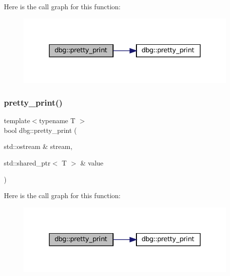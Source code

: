 Here is the call graph for this function\+:
\nopagebreak
\begin{figure}[H]
\begin{center}
\leavevmode
\includegraphics[width=312pt]{namespacedbg_a6cbcb99c1fdd640925d80c390af3954a_cgraph}
\end{center}
\end{figure}
\mbox{\label{namespacedbg_ae36a726fc12c4b6c13878e051f4f3ad7}} 
\subsubsection{\texorpdfstring{pretty\+\_\+print()}{pretty\_print()}\hspace{0.1cm}{\footnotesize\ttfamily [8/19]}}
{\footnotesize\ttfamily template$<$typename T $>$ \\
bool dbg\+::pretty\+\_\+print (\begin{DoxyParamCaption}\item[{std\+::ostream \&}]{stream,  }\item[{std\+::shared\+\_\+ptr$<$ T $>$ \&}]{value }\end{DoxyParamCaption})\hspace{0.3cm}{\ttfamily [inline]}}

Here is the call graph for this function\+:
\nopagebreak
\begin{figure}[H]
\begin{center}
\leavevmode
\includegraphics[width=312pt]{namespacedbg_ae36a726fc12c4b6c13878e051f4f3ad7_cgraph}
\end{center}
\end{figure}
\mbox{\label{namespacedbg_adb407af036065563d2e8ef131305475a}} 
